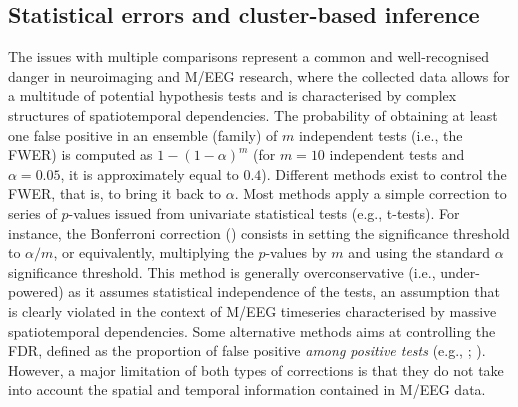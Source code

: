\documentclass[
  doc,
  floatsintext,
  longtable,
  a4paper,
  nolmodern,
  notxfonts,
  notimes,
  colorlinks=true,linkcolor=blue,citecolor=blue,urlcolor=blue]{apa7}
\begin{document}
\subsection{Statistical errors and cluster-based
inference}\label{statistical-errors-and-cluster-based-inference}

The issues with multiple comparisons represent a common and
well-recognised danger in neuroimaging and M/EEG research, where the
collected data allows for a multitude of potential hypothesis tests and
is characterised by complex structures of spatiotemporal dependencies.
The probability of obtaining at least one false positive in an ensemble
(family) of \(m\) independent tests (i.e., the FWER) is computed as
\(1-\left(1-\alpha\right)^{m}\) (for \(m=10\) independent tests and
\(\alpha=0.05\), it is approximately equal to \(0.4\)). Different
methods exist to control the FWER, that is, to bring it back to
\(\alpha\). Most methods apply a simple correction to series of
\(p\)-values issued from univariate statistical tests (e.g., t-tests).
For instance, the Bonferroni correction () consists in setting the significance threshold to \(\alpha/m\),
or equivalently, multiplying the \(p\)-values by \(m\) and using the
standard \(\alpha\) significance threshold. This method is generally
overconservative (i.e., under-powered) as it assumes statistical
independence of the tests, an assumption that is clearly violated in the
context of M/EEG timeseries characterised by massive spatiotemporal
dependencies. Some alternative methods aims at controlling the FDR,
defined as the proportion of false positive \emph{among positive tests}
(e.g., ;
). However, a
major limitation of both types of corrections is that they do not take
into account the spatial and temporal information contained in M/EEG
data.
\end{document}
